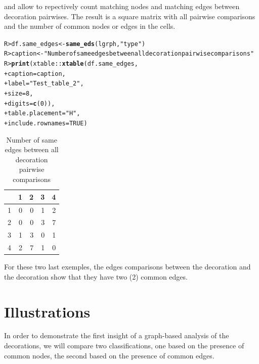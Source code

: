 \documentclass[article]{jss}\usepackage[]{graphicx}\usepackage[]{color}
\makeatletter
\newcommand{\hlnum}[1]{\textcolor[rgb]{0.686,0.059,0.569}{#1}}%
\newcommand{\hlstr}[1]{\textcolor[rgb]{0.192,0.494,0.8}{#1}}%
\newcommand{\hlopt}[1]{\textcolor[rgb]{0,0,0}{#1}}%
\newcommand{\hlstd}[1]{\textcolor[rgb]{0.345,0.345,0.345}{#1}}%
\newcommand{\hlkwb}[1]{\textcolor[rgb]{0.69,0.353,0.396}{#1}}%
\newcommand{\hlkwc}[1]{\textcolor[rgb]{0.333,0.667,0.333}{#1}}%
\newcommand{\hlkwd}[1]{\textcolor[rgb]{0.737,0.353,0.396}{\textbf{#1}}}%
\newenvironment{kframe}{%
 \def\at@end@of@kframe{}%
 \ifinner\ifhmode%
  \def\at@end@of@kframe{\end{minipage}}%
  \begin{minipage}{\columnwidth}%
 \fi\fi%
 \def\FrameCommand##1{\hskip\@totalleftmargin \hskip-\fboxsep
 \colorbox{shadecolor}{##1}\hskip-\fboxsep
     \hskip-\linewidth \hskip-\@totalleftmargin \hskip\columnwidth}%
 \MakeFramed {\advance\hsize-\width
   \@totalleftmargin\z@ \linewidth\hsize
   \@setminipage}}%
 {\par\unskip\endMakeFramed%
 \at@end@of@kframe}
\makeatother
\begin{document}
 and  allow to repectively count matching nodes and matching edges between decoration pairwises. The result is a square matrix with all pairwise comparisons and the number of common nodes or edges in the cells.

\begin{kframe}
\begin{alltt}
\hlstd{R> }\hlstd{df.same_edges} \hlkwb{<-} \hlkwd{same_eds}\hlstd{(lgrph,}\hlstr{"type"}\hlstd{)}
\hlstd{R> }\hlstd{caption} \hlkwb{<-} \hlstr{"Number of same edges between all decoration pairwise comparisons"}
\hlstd{R> }\hlkwd{print}\hlstd{(xtable}\hlopt{::}\hlkwd{xtable}\hlstd{(df.same_edges,}
\hlstd{+ }                     \hlkwc{caption} \hlstd{= caption,}
\hlstd{+ }                     \hlkwc{label} \hlstd{=} \hlstr{"Test_table_2"}\hlstd{,}
\hlstd{+ }                     \hlkwc{size} \hlstd{=} \hlnum{8}\hlstd{,}
\hlstd{+ }                     \hlkwc{digits} \hlstd{=} \hlkwd{c}\hlstd{(}\hlnum{0}\hlstd{)),}
\hlstd{+ }      \hlkwc{table.placement}\hlstd{=}\hlstr{"H"}\hlstd{,}
\hlstd{+ }      \hlkwc{include.rownames} \hlstd{=} \hlnum{TRUE}\hlstd{)}
\end{alltt}
\end{kframe}%
\begin{table}[H]
\centering
\begin{tabular}{rrrrr}
  \hline
 & 1 & 2 & 3 & 4 \\ 
  \hline
1 & 0 & 0 & 1 & 2 \\ 
  2 & 0 & 0 & 3 & 7 \\ 
  3 & 1 & 3 & 0 & 1 \\ 
  4 & 2 & 7 & 1 & 0 \\ 
   \hline
\end{tabular}
\caption{Number of same edges between all decoration pairwise comparisons} 
\label{Test_table_2}
\end{table}


For these two last exemples, the edges comparisons between the decoration  and the decoration  show that they have two (2) common edges.

\section{Illustrations} \label{sec:illustrations}

In order to demonstrate the first insight of a graph-based analysis of the decorations, we will compare two classifications, one based on the presence of common nodes, the second based on the presence of common edges. 
\end{document}
